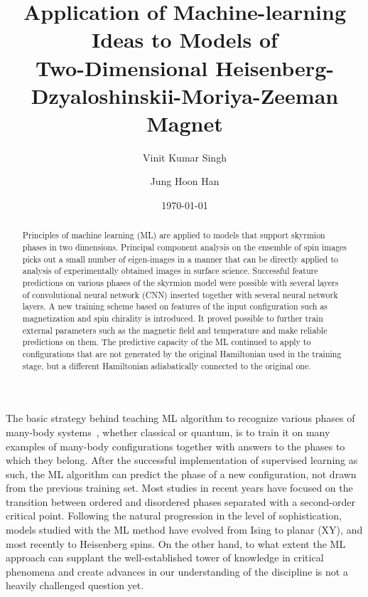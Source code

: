 \documentclass[reprint,amsmath,amssymb,aps,showpacs,superscriptaddress,prl]{revtex4-1}
\begin{document}
%
\title{Application of Machine-learning Ideas to Models of \\ Two-Dimensional Heisenberg-Dzyaloshinskii-Moriya-Zeeman Magnet}

\author{Vinit Kumar Singh}
\author{Jung Hoon Han}
\date{\today}

\begin{abstract}
Principles of machine learning (ML) are applied to models that support skyrmion phases in two dimensions. Principal component analysis on the ensemble of spin images picks out a small number of eigen-images in a manner that can be directly applied to analysis of experimentally obtained images in surface science. Successful feature predictions on various phases of the skyrmion model were possible with several layers of convolutional neural network (CNN) inserted together with several neural network layers. A new training scheme based on features of the input configuration such as magnetization and spin chirality is introduced. It proved possible to further train external parameters such as the magnetic field and temperature and make reliable predictions on them. The predictive capacity of the ML continued to apply to configurations that are not generated by the original Hamiltonian used in the training stage, but a different Hamiltonian adiabatically connected to the original one.
\end{abstract}
\maketitle

The basic strategy behind teaching ML algorithm to recognize various phases of many-body systems~\cite{melko16,wang16,melko17,melko17b,melko17c,tanaka17,scalettar17,wetzel17,wetzel17b,iso18,kim18,zhai17,scalettar17,beach18,zhai18,russian18}, whether classical or quantum, is to train it on many examples of many-body configurations together with answers to the phases to which they belong.  After the successful implementation of supervised learning as such, the ML algorithm can predict the phase of a new configuration, not drawn from the previous training set. Most studies in recent years have focused on the transition between ordered and disordered phases separated with a second-order critical point. Following the natural progression in the level of sophistication, models studied with the ML method have evolved from Ising\cite{melko16,wang16,melko17,melko17b,melko17c,tanaka17,scalettar17,wetzel17,wetzel17b,iso18,kim18} to planar (XY)\cite{zhai17,scalettar17,wetzel17b,beach18,zhai18}, and most recently to Heisenberg\cite{russian18} spins. On the other hand, to what extent the ML approach can supplant the well-established tower of knowledge in critical phenomena and create advances in our understanding of the discipline is not a heavily challenged question yet.
\end{document}

